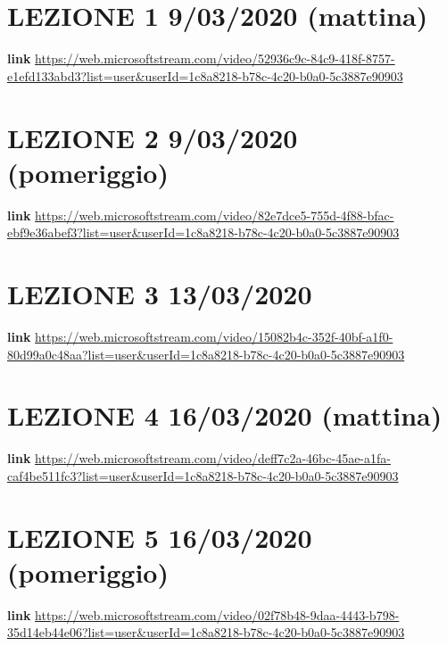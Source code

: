 \documentclass[a4paper, 9pt]{report}
\begin{document}
\maketitle

\section{LEZIONE 1 9/03/2020 (mattina)}
\textbf{link} \url{https://web.microsoftstream.com/video/52936c9c-84c9-418f-8757-e1efd133abd3?list=user&userId=1c8a8218-b78c-4c20-b0a0-5c3887e90903}
\section{LEZIONE 2 9/03/2020 (pomeriggio)}
\textbf{link} \url{https://web.microsoftstream.com/video/82e7dce5-755d-4f88-bfac-ebf9e36abef3?list=user&userId=1c8a8218-b78c-4c20-b0a0-5c3887e90903}
\section{LEZIONE 3 13/03/2020}
\textbf{link} \url{https://web.microsoftstream.com/video/15082b4c-352f-40bf-a1f0-80d99a0c48aa?list=user&userId=1c8a8218-b78c-4c20-b0a0-5c3887e90903}
\section{LEZIONE 4 16/03/2020 (mattina)}
\textbf{link} \url{https://web.microsoftstream.com/video/deff7c2a-46bc-45ae-a1fa-caf4be511fc3?list=user&userId=1c8a8218-b78c-4c20-b0a0-5c3887e90903}
\section{LEZIONE 5 16/03/2020 (pomeriggio)}
\textbf{link} \url{https://web.microsoftstream.com/video/02f78b48-9daa-4443-b798-35d14eb44e06?list=user&userId=1c8a8218-b78c-4c20-b0a0-5c3887e90903}
\end{document}
